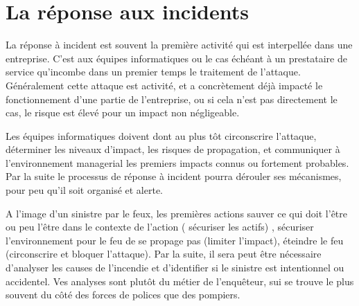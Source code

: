 \section{La réponse aux incidents}

La réponse à incident est souvent la première activité qui est interpellée dans une entreprise. C'est aux équipes informatiques ou le cas échéant à un prestataire de service qu'incombe dans un premier temps le traitement de l'attaque. Généralement cette attaque est activité, et a concrètement déjà impacté le fonctionnement d'une partie de l'entreprise, ou si cela n'est pas directement le cas, le risque est élevé pour un impact non négligeable. 

Les équipes informatiques doivent dont au plus tôt circonscrire l'attaque, déterminer les niveaux d'impact, les risques de propagation, et communiquer à l'environnement managerial les premiers impacts connus ou fortement probables.  Par la suite le processus de réponse à incident pourra dérouler ses mécanismes, pour peu qu'il soit organisé et alerte.

A l'image d'un sinistre par le feux, les premières actions sauver ce qui doit l'être ou peu l'être dans le contexte de l'action ( sécuriser les actifs) , sécuriser l'environnement pour le feu de se propage pas (limiter l'impact), éteindre le feu (circonscrire et bloquer l'attaque). Par la suite, il sera peut être nécessaire d'analyser les causes de l'incendie et d'identifier si le sinistre est intentionnel ou accidentel. Ves analyses sont plutôt du métier de l'enquêteur, sui se trouve le plus souvent du côté des forces de polices que des pompiers.

